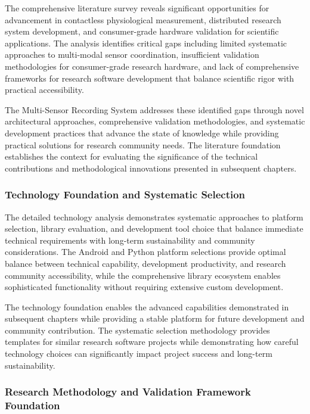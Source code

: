 \documentclass[12pt,a4paper]{report}
\begin{document}
The comprehensive literature survey reveals significant opportunities for advancement in contactless physiological
measurement, distributed research system development, and consumer-grade hardware validation for scientific
applications. The analysis identifies critical gaps including limited systematic approaches to multi-modal sensor
coordination, insufficient validation methodologies for consumer-grade research hardware, and lack of comprehensive
frameworks for research software development that balance scientific rigor with practical accessibility.

The Multi-Sensor Recording System addresses these identified gaps through novel architectural approaches, comprehensive
validation methodologies, and systematic development practices that advance the state of knowledge while providing
practical solutions for research community needs. The literature foundation establishes the context for evaluating the
significance of the technical contributions and methodological innovations presented in subsequent chapters.

\subsubsection{Technology Foundation and Systematic Selection}

The detailed technology analysis demonstrates systematic approaches to platform selection, library evaluation, and
development tool choice that balance immediate technical requirements with long-term sustainability and community
considerations. The Android and Python platform selections provide optimal balance between technical capability,
development productivity, and research community accessibility, while the comprehensive library ecosystem enables
sophisticated functionality without requiring extensive custom development.

The technology foundation enables the advanced capabilities demonstrated in subsequent chapters while providing a stable
platform for future development and community contribution. The systematic selection methodology provides templates for
similar research software projects while demonstrating how careful technology choices can significantly impact project
success and long-term sustainability.

\subsubsection{Research Methodology and Validation Framework Foundation}
\end{document}
